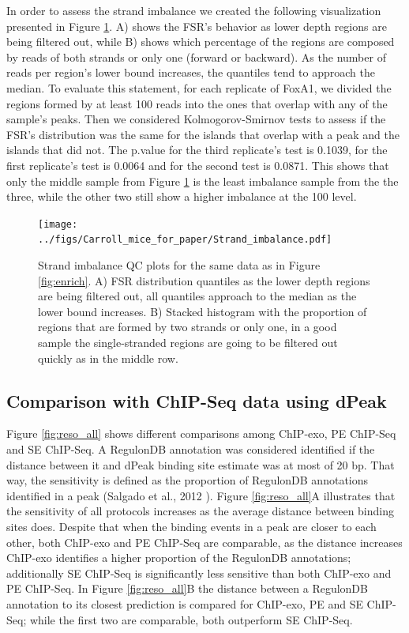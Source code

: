 \documentclass[11pt]{article}\usepackage[]{graphicx}\usepackage[]{color}
\begin{document}
In order to assess the strand imbalance we created the following
visualization presented in Figure \ref{fig:strand}. A) shows the FSR's
behavior as lower depth regions are being filtered out, while B) shows
which percentage of the regions are composed by reads of both strands
or only one (forward or backward). As the number of reads per region's
lower bound increases, the quantiles tend to approach the median. To
evaluate this statement, for each replicate of FoxA1, we divided the
regions formed by at least 100 reads into the ones that overlap
with any of the sample's peaks. Then we considered Kolmogorov-Smirnov
tests to assess if the FSR's distribution was the same for the islands
that overlap with a peak and the islands that did not. The p.value for
the third replicate's test is 0.1039, for the first
replicate's test is 0.0064 and for the second test is
0.0871. This shows that only the middle sample from Figure
\ref{fig:strand} is the least imbalance sample from the the three,
while the other two still show a higher imbalance at the 100
level.

\begin{figure}[H]
  \centering  
  \texttt{[image: ../figs/Carroll\_mice\_for\_paper/Strand\_imbalance.pdf]} 
  \caption{Strand imbalance QC plots for the same data as in Figure
    \ref{fig:enrich}. A) FSR distribution quantiles as the lower depth
    regions are being filtered out, all quantiles approach to the
    median as the lower bound increases. B) Stacked histogram with the
    proportion of regions that are formed by two strands or only one,
    in a good sample the single-stranded regions are going to be
    filtered out quickly as in the middle row.}
  \label{fig:strand}
\end{figure}

\subsection{Comparison with ChIP-Seq data using dPeak}
\label{sec:dpeak_analysis}




Figure \ref{fig:reso_all} shows different comparisons among ChIP-exo,
PE ChIP-Seq and SE ChIP-Seq. A RegulonDB annotation was considered
identified if the distance between it and dPeak binding site estimate
was at most of 20 bp. That way, the sensitivity is defined as
the proportion of RegulonDB annotations identified in a peak (Salgado
et al., 2012 \cite{regulonDB}). Figure \ref{fig:reso_all}A illustrates
that the sensitivity of all protocols increases as the average
distance between binding sites does. Despite that when the binding
events in a peak are closer to each other, both ChIP-exo and PE
ChIP-Seq are comparable, as the distance increases ChIP-exo identifies
a higher proportion of the RegulonDB annotations; additionally SE
ChIP-Seq is significantly less sensitive than both ChIP-exo and PE
ChIP-Seq. In Figure \ref{fig:reso_all}B the distance between a
RegulonDB annotation to its closest prediction is compared for
ChIP-exo, PE and SE ChIP-Seq; while the first two are comparable,
both outperform SE ChIP-Seq.
\end{document}

